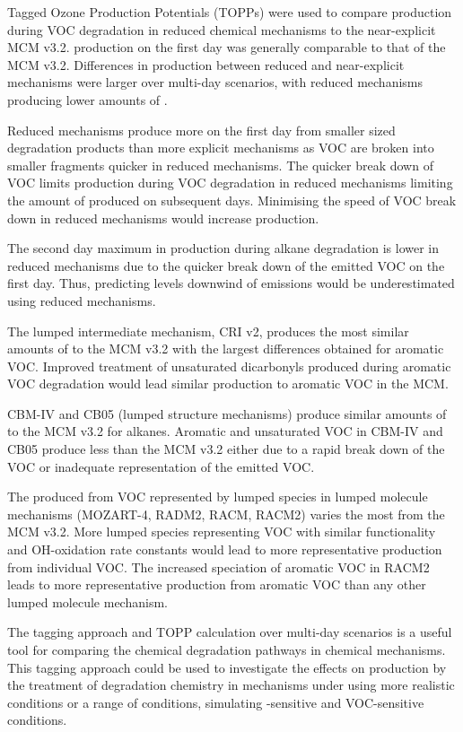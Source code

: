 Tagged Ozone Production Potentials (TOPPs) were used to compare  production during VOC degradation in reduced chemical mechanisms to the near-explicit MCM v3.2. 
 production on the first day was generally comparable to that of the MCM v3.2.
Differences in  production between reduced and near-explicit mechanisms were larger over multi-day scenarios, with reduced mechanisms producing lower amounts of .

Reduced mechanisms produce more  on the first day from smaller sized degradation products than more explicit mechanisms as VOC are broken into smaller fragments quicker in reduced mechanisms.
The quicker break down of VOC limits  production during VOC degradation in reduced mechanisms limiting the amount of  produced on subsequent days.
Minimising the speed of VOC break down in reduced mechanisms would increase  production.

The second day maximum in  production during alkane degradation is lower in reduced mechanisms due to the quicker break down of the emitted VOC on the first day.
Thus, predicting  levels downwind of emissions would be underestimated using reduced mechanisms.

The lumped intermediate mechanism, CRI v2, produces the most similar amounts of  to the MCM v3.2 with the largest differences obtained for aromatic VOC.
Improved treatment of unsaturated dicarbonyls produced during aromatic VOC degradation would lead similar  production to aromatic VOC in the MCM.

CBM-IV and CB05 (lumped structure mechanisms) produce similar amounts of  to the MCM v3.2 for alkanes.
Aromatic and unsaturated VOC in CBM-IV and CB05 produce less  than the MCM v3.2 either due to a rapid break down of the VOC or inadequate representation of the emitted VOC.

The  produced from VOC represented by lumped species in lumped molecule mechanisms (MOZART-4, RADM2, RACM, RACM2) varies the most from the MCM v3.2.
More lumped species representing VOC with similar functionality and OH-oxidation rate constants would lead to more representative  production from individual VOC.
The increased speciation of aromatic VOC in RACM2 leads to more representative  production from aromatic VOC than any other lumped molecule mechanism.

The tagging approach and TOPP calculation over multi-day scenarios is a useful tool for comparing the chemical degradation pathways in chemical mechanisms. 
This tagging approach could be used to investigate the effects on  production by the treatment of degradation chemistry in mechanisms under using more realistic  conditions or a range of  conditions, simulating -sensitive and VOC-sensitive conditions.
